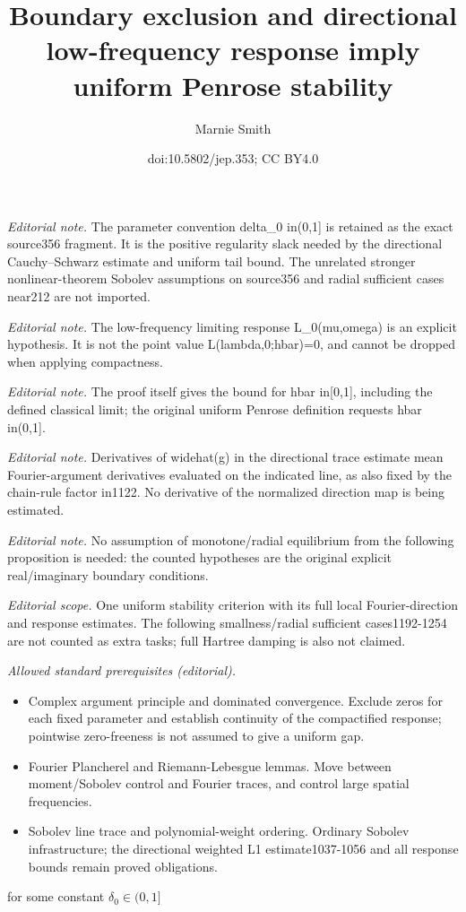 \documentclass[10pt,a4paper]{article}
\title{Boundary exclusion and directional low-frequency response imply uniform Penrose stability}
\author{Marnie Smith}
\date{doi:10.5802/jep.353; CC BY4.0}
\theoremstyle{plain}
\theoremstyle{remark}
\begin{document}
\maketitle
\noindent\textit{Editorial note.} The parameter convention delta\_0 in(0,1] is retained as the exact source356 fragment. It is the positive regularity slack needed by the directional Cauchy–Schwarz estimate and uniform tail bound. The unrelated stronger nonlinear-theorem Sobolev assumptions on source356 and radial sufficient cases near212 are not imported.\par\medskip
\noindent\textit{Editorial note.} The low-frequency limiting response L\_0(mu,omega) is an explicit hypothesis. It is not the point value L(lambda,0;hbar)=0, and cannot be dropped when applying compactness.\par\medskip
\noindent\textit{Editorial note.} The proof itself gives the bound for hbar in[0,1], including the defined classical limit; the original uniform Penrose definition requests hbar in(0,1].\par\medskip
\noindent\textit{Editorial note.} Derivatives of widehat(g) in the directional trace estimate mean Fourier-argument derivatives evaluated on the indicated line, as also fixed by the chain-rule factor in1122. No derivative of the normalized direction map is being estimated.\par\medskip
\noindent\textit{Editorial note.} No assumption of monotone/radial equilibrium from the following proposition is needed: the counted hypotheses are the original explicit real/imaginary boundary conditions.\par\medskip
\noindent\textit{Editorial scope.} One uniform stability criterion with its full local Fourier-direction and response estimates. The following smallness/radial sufficient cases1192-1254 are not counted as extra tasks; full Hartree damping is also not claimed.\par\medskip
\noindent\textit{Allowed standard prerequisites (editorial).}\begin{itemize}
\item Complex argument principle and dominated convergence. Exclude zeros for each fixed parameter and establish continuity of the compactified response; pointwise zero-freeness is not assumed to give a uniform gap.
\item Fourier Plancherel and Riemann-Lebesgue lemmas. Move between moment/Sobolev control and Fourier traces, and control large spatial frequencies.
\item Sobolev line trace and polynomial-weight ordering. Ordinary Sobolev infrastructure; the directional weighted L1 estimate1037-1056 and all response bounds remain proved obligations.
\end{itemize}\medskip
for some constant $\delta_0\in(0,1]$
\end{document}
